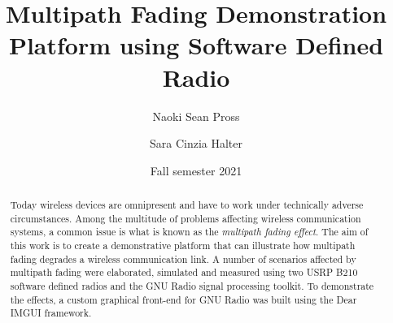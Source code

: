 \documentclass[
	overfullrule,
	paper = a4, twoside, openright, BCOR = 5mm,
	headinclude, footexclude,
	fontsize = 11pt,
	cleardoublepage = empty,
	titlepage, abstract = on,
	automark,
	numbers = noenddot
]{scrreprt}
\title{Multipath Fading Demonstration Platform using Software Defined Radio}
\author{Naoki Sean Pross \and Sara Cinzia Halter}
\date{Fall semester 2021}
\begin{document}
	\hypersetup{pageanchor = false}

	

	\begin{abstract}
		Today wireless devices are omnipresent and have to work under technically adverse circumstances. Among the multitude of problems affecting wireless communication systems, a common issue is what is known as the \emph{multipath fading effect}. The aim of this work is to create a demonstrative platform that can illustrate how multipath fading degrades a wireless communication link. A number of scenarios affected by multipath fading were elaborated, simulated and measured using two USRP B210 software defined radios and the GNU Radio signal processing toolkit. To demonstrate the effects, a custom graphical front-end for GNU Radio was built using the Dear IMGUI framework.
	\end{abstract}

	\cleardoublepage
	\setcounter{page}{1}

	\tableofcontents
	\cleardoublepage

\end{document}
